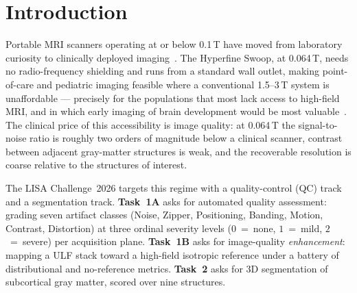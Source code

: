\documentclass[runningheads]{llncs}
\begin{document}
\FloatBarrier
\section{Introduction}
\label{sec:intro}

Portable MRI scanners operating at or below 0.1\,T have moved from laboratory
curiosity to clinically deployed imaging~\cite{marques2019low,sheth2021portable}.
The Hyperfine Swoop, at 0.064\,T, needs no radio-frequency shielding and runs
from a standard wall outlet, making point-of-care and pediatric imaging feasible
where a conventional 1.5--3\,T system is unaffordable --- precisely for the
populations that most lack access to high-field MRI, and in which early imaging of
brain development would be most valuable~\cite{arnold2023low,sarracanie2020}.
The clinical price of this accessibility is image quality: at 0.064\,T the
signal-to-noise ratio is roughly two orders of magnitude below a clinical
scanner, contrast between adjacent gray-matter structures is weak, and the
recoverable resolution is coarse relative to the structures of interest.

The LISA Challenge~2026 targets this regime with a quality-control (QC) track and
a segmentation track. \textbf{Task~1A} asks for automated quality assessment:
grading seven artifact classes (Noise, Zipper, Positioning, Banding, Motion,
Contrast, Distortion) at three ordinal severity levels ($0$~=~none, $1$~=~mild,
$2$~=~severe) per acquisition plane. \textbf{Task~1B} asks for image-quality
\emph{enhancement}: mapping a ULF stack toward a high-field isotropic reference
under a battery of distributional and no-reference metrics. \textbf{Task~2} asks
for 3D segmentation of subcortical gray matter, scored over nine structures.
\end{document}
